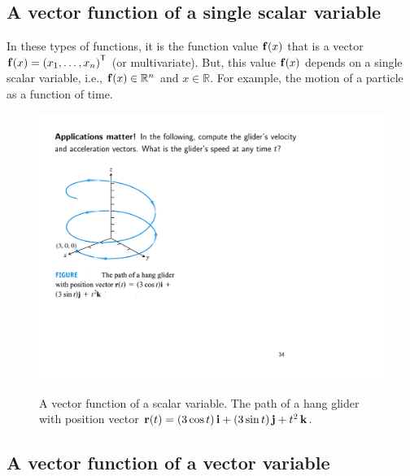 \documentclass[12pt,letter]{article}
\begin{document}
	
\newpage
\subsection{A vector function of a single scalar variable}

In these types of functions, it is the function value ${\bf f}(x)$ that is a vector ${\bf f}(x) = \left(x_1,\hdots,x_n\right)^\mathsf{T}$ (or multivariate). But, this value ${\bf f}(x)$ depends on a single scalar variable, i.e., ${\bf f}(x) \in \mathbb{R}^n$ and ${x} \in \mathbb{R}$. For example, the motion of a particle as a function of time.
\begin{figure}[H]
	\begin{center}
		{\includegraphics[width=.30\textwidth]{figs/hang_glider}}
	\end{center}
	\caption{A vector function of a scalar variable. The path of a hang glider with position vector 
	 ${\bf r}(t) = (3\cos t)\,{\bf i} + (3\sin t)\,{\bf j} + t^2\,{\bf k}$.}
	\label{fig_functionType3}
\end{figure}



\subsection{A vector function of a vector variable} 
\end{document}
